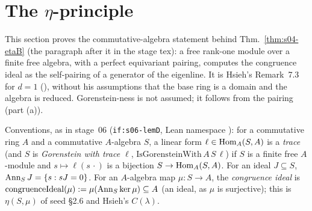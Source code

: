 \section{The \texorpdfstring{$\eta$}{eta}-principle}

This section proves the commutative-algebra statement behind Thm.~\ref{thm:s04-etaB} (the paragraph after it in the stage tex): a free
rank-one module over a finite free algebra, with a perfect equivariant pairing, computes the congruence ideal as the self-pairing of a
generator of the eigenline. It is Hsieh's Remark~7.3 for $d=1$
(), without his assumptions that the base
ring is a domain and the algebra is reduced. Gorenstein-ness is not assumed; it follows from the pairing (part (a)).

Conventions, as in stage~06 (\texttt{if:s06-lemD}, Lean namespace ): for a commutative ring $A$ and a
commutative $A$-algebra $S$, a linear form $\ell\in\operatorname{Hom}_A(S,A)$ is a \emph{trace} (and $S$ is \emph{Gorenstein with trace $\ell$},
$\mathrm{IsGorensteinWith}\,A\,S\,\ell$) if $S$ is a finite free $A$-module and $s\mapsto\ell(s\,\cdot)$ is a bijection
$S\to\operatorname{Hom}_A(S,A)$. For an ideal $J\subseteq S$, $\operatorname{Ann}_S J=\{s:sJ=0\}$. For an $A$-algebra map $\mu:S\to A$, the \emph{congruence ideal}
is $\mathrm{congruenceIdeal}(\mu):=\mu(\operatorname{Ann}_S\ker\mu)\subseteq A$ (an ideal, as $\mu$ is surjective); this is $\eta(S,\mu)$ of
seed \S2.6 and Hsieh's $C(\lambda)$.

